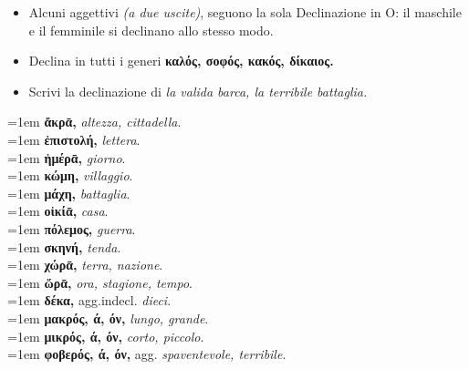 \documentclass[nols]{tufte-handout}
\newcommand{\textls}[2][5]{%
    \begingroup\addfontfeatures{LetterSpace=#1}#2\endgroup
  }
\renewcommand{\smallcapsspacing}[1]{\textls[10]{#1}}
\renewcommand{\textsc}[1]{\smallcapsspacing{\textsmallcaps{#1}}}
\begin{document}
\begin{itemize}
\item[\textsc{1.}] Alcuni aggettivi \textit{(a due uscite)}, seguono la sola Declinazione in O: il maschile e il femminile si declinano allo stesso modo. 
\end{itemize}

\begin{itemize}
\item[\textsc{1.}] Declina in tutti i generi \textbf{καλός, σοφός, κακός, δίκαιος.}
\item[\textsc{2.}] Scrivi la declinazione di \textit{la valida barca, la terribile battaglia.}
\end{itemize}

\newpage


\begin{multicols}{2}
    \noindent \hangindent=1em \textbf{ἄκρᾱ,} \textit{altezza, cittadella}.  \\
    \noindent \hangindent=1em \textbf{ἐπιστολή,} \textit{lettera}.  \\
    \noindent \hangindent=1em \textbf{ἡμέρᾱ,} \textit{giorno}.  \\
    \noindent \hangindent=1em \textbf{κώμη,} \textit{villaggio}.  \\
    \noindent \hangindent=1em \textbf{μάχη,} \textit{battaglia}.  \\
    \noindent \hangindent=1em \textbf{οἰκίᾱ,} \textit{casa}.  \\
    \noindent \hangindent=1em \textbf{πόλεμος,} \textit{guerra}.  \\
    \noindent \hangindent=1em \textbf{σκηνή,} \textit{tenda}.  \\
	
    \noindent \hangindent=1em \textbf{χώρᾱ,} \textit{terra, nazione}.  \\
    \noindent \hangindent=1em \textbf{ὥρᾱ,} \textit{ora, stagione, tempo}.  \\
	
	\noindent \hangindent=1em \textbf{δέκα,} agg.indecl. \textit{dieci}. \\ 
	
	
    \noindent \hangindent=1em \textbf{μακρός, ά, όν,} \textit{lungo, grande}.  \\
	\noindent \hangindent=1em \textbf{μικρός, ά, όν,} \textit{corto, piccolo}.  \\
	\noindent \hangindent=1em \textbf{φοβερός, ά, όν,} agg. \textit{spaventevole, terribile}.  \\
\end{multicols}
\end{document}
